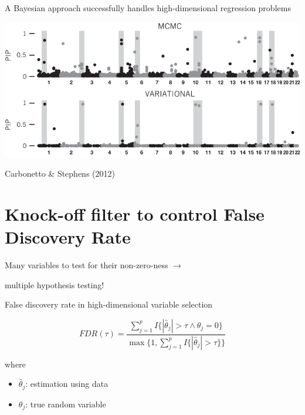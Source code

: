 \documentclass[
  ignorenonframetext,
  aspectratio=169]{beamer}
\begin{document}
\begin{frame}{A Bayesian approach successfully handles high-dimensional
regression problems}
\protect\hypertarget{a-bayesian-approach-successfully-handles-high-dimensional-regression-problems}{}
\scriptsize

\begin{center}\includegraphics[width=\textwidth]{Vis/gwas_cm} \end{center}

\normalsize

\vfill

\tiny

Carbonetto \& Stephens (2012)
\end{frame}

\hypertarget{knock-off-filter-to-control-false-discovery-rate}{%
\section{Knock-off filter to control False Discovery
Rate}\label{knock-off-filter-to-control-false-discovery-rate}}

\begin{frame}{}
\protect\hypertarget{section-1}{}
\Large

Many variables to test for their non-zero-ness \(\to\)

\Huge

multiple hypothesis testing!
\end{frame}

\begin{frame}{False discovery rate in high-dimensional variable
selection}
\protect\hypertarget{false-discovery-rate-in-high-dimensional-variable-selection}{}
\Large

\[FDR(\tau) =
\frac{\sum_{j=1}^{p} I\{ |\hat{\theta}_{j}| > \tau \wedge \theta_{j} = 0 \}}
{\max\{1, \sum_{j=1}^{p} I\{ |\hat{\theta}_{j}| > \tau \} \}}\]

\normalsize

where

\begin{itemize}
\item
  \(\hat\theta_{j}\): estimation using data
\item
  \(\theta_{j}\): true random variable
\end{itemize}
\end{frame}
\end{document}
